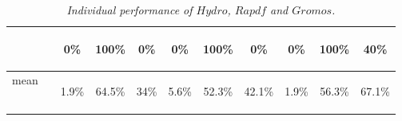 \documentclass[a4paper,20pt,notitlepage,openbib]{article}
\begin{document}
\begin{table}[htbp]
\begin{center}
\begin{tabular}{| l | c | c c c | c c c | c c c |}
        &     & \begin{small}0\%\end{small} & \begin{small}100\% \end{small} &\begin{small}0\%\end{small} & \begin{small}0\%  \end{small}&\begin{small}100\% \end{small} &\begin{small}0\%\end{small} & \begin{small}0\%\end{small}  &\begin{small}100\%\end{small} & \begin{small}40\%\end{small} \\
\hline
mean & &  \begin{small}1.9\%\end{small} & \begin{small}64.5\%\end{small}  & \begin{small}34\%\end{small} & \begin{small}5.6\%\end{small} & \begin{small}52.3\%\end{small} & \begin{small}42.1\%\end{small} & \begin{small}1.9\%\end{small} & \begin{small}56.3\%\end{small} &  \begin{small}67.1\%\end{small} \\
\hline
\end{tabular}
\end{center}
\caption{\label{perf} \textit{Individual performance of $Hydro$, $Rapdf$ and $Gromos$.}}
\end{table}
\end{document}
